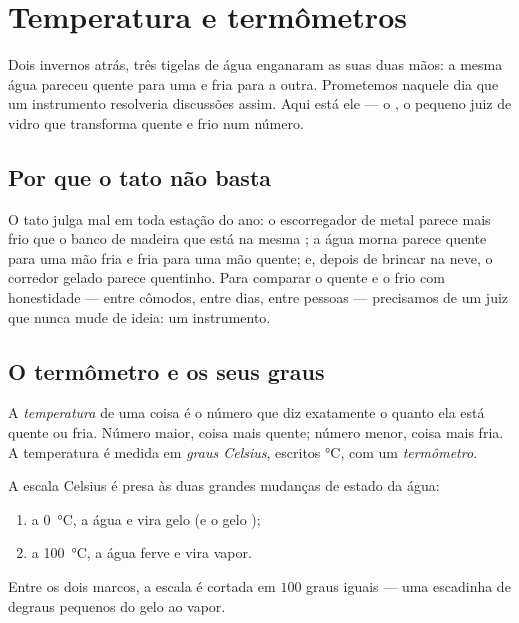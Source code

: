 \chapter{Temperatura e termômetros}\label{ch:g3:temperature-thermometers}

Dois invernos atrás, três tigelas de água enganaram as suas duas
mãos: a mesma água pareceu quente para uma e fria para a outra.
Prometemos naquele dia que um instrumento resolveria discussões
assim. Aqui está ele --- o , o pequeno juiz de vidro que
transforma quente e frio num número.

\section{Por que o tato não basta}

\begin{example}\label{ex:g3:temperature-thermometers:unfair}
O tato julga mal em toda estação do ano: o escorregador de metal
parece mais frio que o banco de madeira que está na mesma ; a
água morna parece quente para uma mão fria e fria para uma mão
quente; e, depois de brincar na neve, o corredor gelado parece
quentinho. Para comparar o quente e o frio com honestidade --- entre
cômodos, entre dias, entre pessoas --- precisamos de um juiz que
nunca mude de ideia: um instrumento.
\end{example}

\section{O termômetro e os seus graus}

\begin{definition}[Temperatura]\label{def:g3:temperature-thermometers:temperature}
A \emph{temperatura} de uma coisa é o número que
diz exatamente o quanto ela está quente ou fria. Número maior, coisa
mais quente; número menor, coisa mais fria. A temperatura é medida em
\emph{graus Celsius}, escritos \unit{\celsius},
com um \emph{termômetro}.
\end{definition}

\begin{proposition}\label{prop:g3:temperature-thermometers:milestones}
A escala Celsius é presa às duas grandes mudanças de estado da água:
\begin{enumerate}
  \item a \qty{0}{\celsius}, a água  e vira gelo (e o gelo
        );
  \item a \qty{100}{\celsius}, a água ferve e vira vapor.
\end{enumerate}
Entre os dois marcos, a escala é cortada em $100$ graus iguais ---
uma escadinha de degraus pequenos do gelo ao vapor.
\end{proposition}

